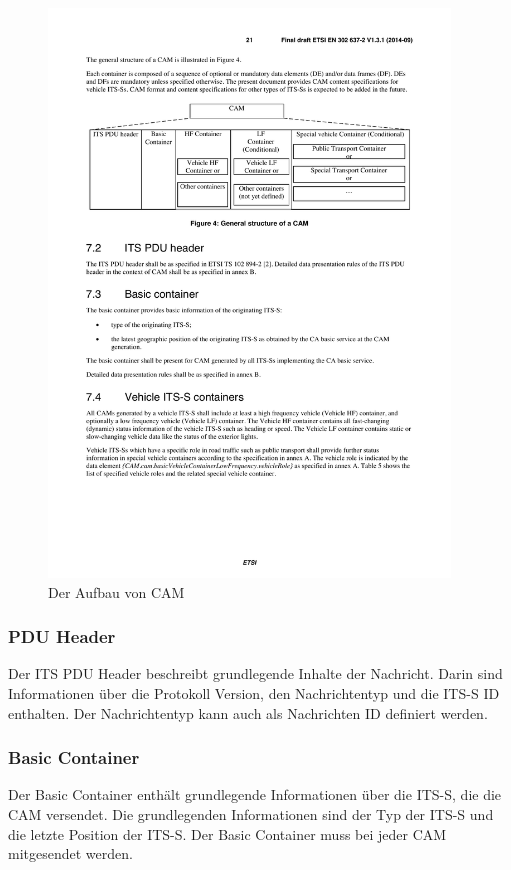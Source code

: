 \begin{figure}[htbp]
	\includegraphics[width=0.95\textwidth]{content/images/04_facilitylayer/camAufbau.pdf}
	\caption{Der Aufbau von CAM \cite{en302637-2}}
	\label{fig:aufbauCam}
\end{figure}

\subsubsection{PDU Header \label{facilitylayer_PduHeader}}
Der \ac{ITS} \ac{PDU} Header beschreibt grundlegende Inhalte der Nachricht. Darin sind Informationen über die Protokoll Version, den Nachrichtentyp und die \ac{ITS-S} \ac{ID} enthalten. Der Nachrichtentyp kann auch als Nachrichten \ac{ID} definiert werden. 


\subsubsection{Basic Container}
Der Basic Container enthält grundlegende Informationen über die \ac{ITS-S}, die die \ac{CAM} versendet. Die grundlegenden Informationen sind der Typ der \ac{ITS-S} und die letzte Position der \ac{ITS-S}. Der Basic Container muss bei jeder \ac{CAM} mitgesendet werden.

